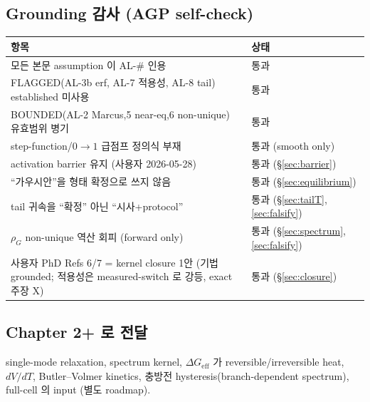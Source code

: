 \documentclass[11pt,a4paper]{article}
\newcommand{\eff}{\mathrm{eff}}
\begin{document}
\subsection{Grounding 감사 (AGP self-check)}
\begin{longtable}{p{} p{}}
\toprule 항목 & 상태 \\ \midrule \endhead
모든 본문 assumption 이 AL-\# 인용 & 통과 \\
FLAGGED(AL-3b erf, AL-7 적용성, AL-8 tail) established 미사용 & 통과 \\
BOUNDED(AL-2 Marcus,5 near-eq,6 non-unique) 유효범위 병기 & 통과 \\
step-function/$0\!\to\!1$ 급점프 정의식 부재 & 통과 (smooth only) \\
activation barrier 유지 (사용자 2026-05-28) & 통과 (\S\ref{sec:barrier}) \\
``가우시안''을 형태 확정으로 쓰지 않음 & 통과 (\S\ref{sec:equilibrium}) \\
tail 귀속을 ``확정'' 아닌 ``시사+protocol'' & 통과 (\S\ref{sec:tailT},\ref{sec:falsify}) \\
$\rho_G$ non-unique 역산 회피 (forward only) & 통과 (\S\ref{sec:spectrum},\ref{sec:falsify}) \\
사용자 PhD Refs 6/7 = kernel closure 1안 (기법 grounded; 적용성은 measured-switch 로 강등, exact 주장 X) & 통과 (\S\ref{sec:closure}) \\
\bottomrule
\end{longtable}

\subsection{Chapter 2+ 로 전달}
single-mode relaxation, spectrum kernel, $\Delta G_\eff$ 가 reversible/irreversible heat,
$dV/dT$, Butler--Volmer kinetics, 충방전 hysteresis(branch-dependent spectrum), full-cell
의 input (별도 roadmap).
\end{document}
